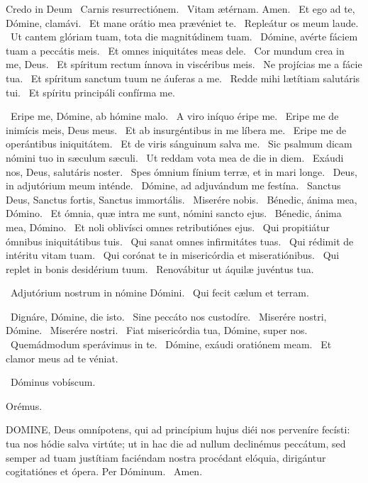 Credo in Deum  \V\ Carnis resurrectiónem. \R\ Vitam ætérnam. Amen. \V\ Et ego ad te, Dómine, clamávi. \R\ Et mane orátio mea prævéniet te. \V\ Repleátur os meum laude. \R\ Ut cantem glóriam tuam, tota die magnitúdinem tuam. \V\ Dómine, avérte fáciem tuam a peccátis meis. \R\ Et omnes iniquitátes meas dele. \V\ Cor mundum crea in me, Deus. \R\ Et spíritum rectum ínnova in viscéribus meis. \V\ Ne projícias me a fácie tua. \R\ Et spíritum sanctum tuum ne áuferas a me. \V\ Redde mihi lætítiam salutáris tui. \R\ Et spíritu principáli confírma me.


\V\ Eripe me, Dómine, ab hómine malo. \R\ A viro iníquo éripe me. \V\ Eripe me de inimícis meis, Deus meus. \R\ Et ab insurgéntibus in me líbera me. \V\ Eripe me de operántibus iniquitátem. \R\ Et de viris sánguinum salva me. \V\ Sic psalmum dicam nómini tuo in sæculum sæculi. \R\ Ut reddam vota mea de die in diem. \V\ Exáudi nos, Deus, salutáris noster. \R\ Spes ómnium fínium terræ, et in mari longe. \V\ Deus, in adjutórium meum inténde. \R\ Dómine, ad adjuvándum me festína. \V\ Sanctus Deus, Sanctus fortis, Sanctus immortális. \R\ Miserére nobis. \V\ Bénedic, ánima mea, Dómino. \R\ Et ómnia, quæ intra me sunt, nómini sancto ejus. \V\ Bénedic, ánima mea, Dómino. \R\ Et noli oblivísci omnes retributiónes ejus. \V\ Qui propitiátur ómnibus iniquitátibus tuis. \R\ Qui sanat omnes infirmitátes tuas. \V\ Qui rédimit de intéritu vitam tuam. \R\ Qui corónat te in misericórdia et miseratiónibus. \V\ Qui replet in bonis desidérium tuum. \R\ Renovábitur ut áquilæ juvéntus tua.


\V\ Adjutórium nostrum in nómine Dómini. \R\ Qui fecit cælum et terram.


\V\ Dignáre, Dómine, die isto. \R\ Sine peccáto nos custodíre. \V\ Miserére nostri, Dómine. \R\ Miserére nostri. \V\ Fiat misericórdia tua, Dómine, super nos. \R\ Quemádmodum sperávimus in te. \V\ Dómine, exáudi oratiónem meam. \R\ Et clamor meus ad te véniat.

\V\ Dóminus vobíscum.

Orémus. 

\lettrine[lines=2]{D}{OMINE}, Deus omnípotens, qui ad princípium hujus diéi nos perveníre fecísti: tua nos hódie salva virtúte; ut in hac die ad nullum declinémus peccátum, sed semper ad tuam justítiam faciéndam nostra procédant elóquia, dirigántur cogitatiónes et ópera. Per Dóminum. \R\ Amen.

